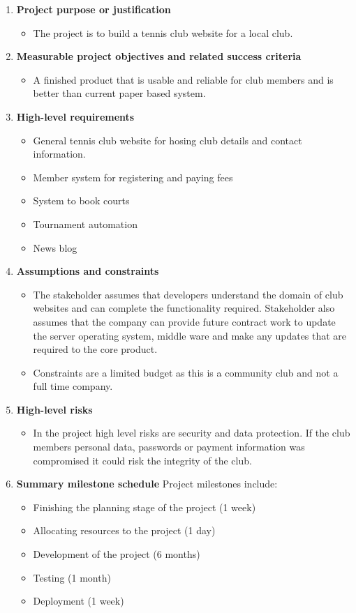 \begin{enumerate}
\item \textbf{Project purpose or justification}
\begin{itemize}
\item The project is to build a tennis club website for a local club.
\end{itemize}
\item \textbf{Measurable project objectives and related success criteria}
\begin{itemize}
\item A finished product that is usable and reliable for club members and is better than current paper based system.
\end{itemize}
\item \textbf{High-level requirements}
\begin{itemize}
\item General tennis club website for hosing club details and contact information.
\item Member system for registering and paying fees
\item System to book courts
\item Tournament automation
\item News blog
\end{itemize}
\item \textbf{Assumptions and constraints}
\begin{itemize}
\item The stakeholder assumes that developers understand the domain of club websites and can complete the functionality required. Stakeholder also assumes that the company can provide future contract work to update the server operating system, middle ware and make any updates that are required to the core product.

\item Constraints are a limited budget as this is a community club and not a full time company.
\end{itemize}

\item \textbf{High-level risks}
\begin{itemize}
\item In the project high level risks are security and data protection. If the club members personal data, passwords or payment information was compromised it could risk the integrity of the club.
\end{itemize}

\item \textbf{Summary milestone schedule}
Project milestones include:
\begin{itemize}
\item Finishing the planning stage of the project (1 week)
\item Allocating resources to the project (1 day)
\item Development of the project (6 months)
\item Testing (1 month)
\item Deployment (1 week)
\end{itemize}


\end{enumerate}
